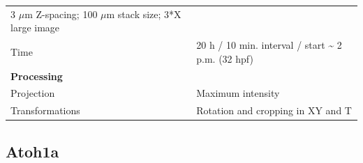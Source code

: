 \documentclass[11pt,singlespacinge,twoside]{reedthesis} %
\begin{document}
\begin{longtable}[]{@{}ll@{}}
\begin{minipage}[t]{0.73\columnwidth}
3 \(\mu\)m Z-spacing; 100 \(\mu\)m stack size; 3*X large image\strut
\end{minipage}\tabularnewline
\begin{minipage}[t]{0.21\columnwidth}\raggedright
Time\strut
\end{minipage} & \begin{minipage}[t]{0.73\columnwidth}\raggedright
20 h / 10 min. interval / start \textasciitilde{} 2 p.m. (32 hpf)\strut
\end{minipage}\tabularnewline
\begin{minipage}[t]{0.21\columnwidth}\raggedright
\textbf{Processing}\strut
\end{minipage} & \begin{minipage}[t]{0.73\columnwidth}\raggedright
\strut
\end{minipage}\tabularnewline
\begin{minipage}[t]{0.21\columnwidth}\raggedright
Projection\strut
\end{minipage} & \begin{minipage}[t]{0.73\columnwidth}\raggedright
Maximum intensity\strut
\end{minipage}\tabularnewline
\begin{minipage}[t]{0.21\columnwidth}\raggedright
Transformations\strut
\end{minipage} & \begin{minipage}[t]{0.73\columnwidth}\raggedright
Rotation and cropping in XY and T\strut
\end{minipage}\tabularnewline
\bottomrule
\end{longtable}
\hypertarget{mat-ato-set}{%
\subsection{Atoh1a}\label{mat-ato-set}}
\end{document}

